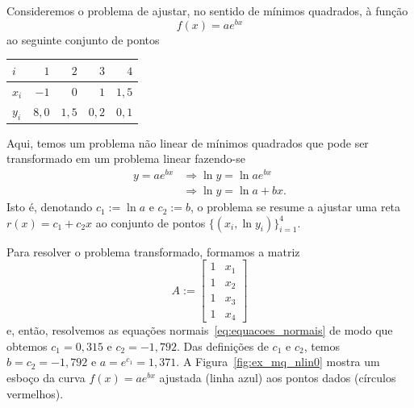 \begin{ex}\label{ex:ajuste_nlin0}
  Consideremos o problema de ajustar, no sentido de mínimos quadrados, à função
  \begin{equation}
    f(x) = ae^{bx}
  \end{equation}
ao seguinte conjunto de pontos
\begin{center}
  \begin{tabular}{l|rrrr}
    $i$ & $1$ & $2$ & $3$ & $4$ \\\hline
    $x_i$ & $-1$ & $0$ & $1$ & $1,5$\\
    $y_i$ & $8,0$ & $1,5$ & $0,2$ & $0,1$\\\hline
  \end{tabular}
\end{center}

Aqui, temos um problema não linear de mínimos quadrados que pode ser transformado em um problema linear fazendo-se
\begin{align}
  y = ae^{bx} &\Rightarrow \ln y = \ln ae^{bx}\\
             &\Rightarrow \ln y = \ln a + bx.
\end{align}
Isto é, denotando $c_1 := \ln a$ e $c_2 := b$, o problema se resume a ajustar uma reta $r(x) = c_1 + c_2x$ ao conjunto de pontos $\{(x_i, \ln y_i)\}_{i=1}^4$. 

Para resolver o problema transformado, formamos a matriz
\begin{equation}
  A :=
  \begin{bmatrix}
    1 & x_1 \\
    1 & x_2 \\
    1 & x_3 \\
    1 & x_4
  \end{bmatrix}
\end{equation}
e, então, resolvemos as equações normais~\eqref{eq:equacoes_normais} de modo que obtemos $c_1=0,315$ e $c_2=-1,792$. Das definições de $c_1$ e $c_2$, temos $b = c_2 = -1,792$ e $a = e^{c_1} = 1,371$. A Figura~\ref{fig:ex_mq_nlin0} mostra um esboço da curva $f(x) = ae^{bx}$ ajustada (linha azul) aos pontos dados (círculos vermelhos).


\end{ex}
